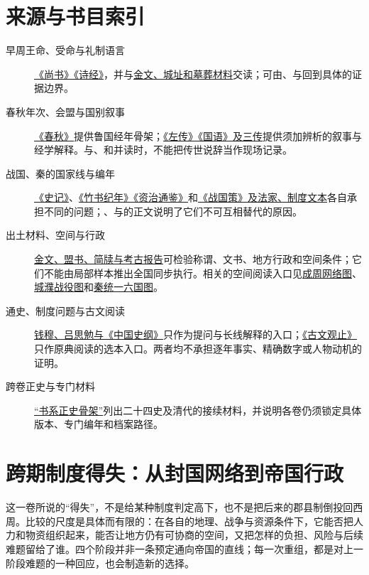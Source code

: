 \section{来源与书目索引}

\begin{description}
  \item[早周王命、受命与礼制语言] \hyperref[src:western-texts]{《尚书》《诗经》}，并与\hyperref[src:excavated]{金文、城址和墓葬材料}交读；可由、与回到具体的证据边界。
  \item[春秋年次、会盟与国别叙事] \hyperref[src:chunqiu]{《春秋》}提供鲁国经年骨架；\hyperref[src:zuozhuan-guoyu]{《左传》《国语》及三传}提供须加辨析的叙事与经学解释。与、和并读时，不能把传世说辞当作现场记录。
  \item[战国、秦的国家线与编年] \hyperref[src:shiji]{《史记》}、\hyperref[src:bamboo-annals-zizhi]{《竹书纪年》《资治通鉴》}和\hyperref[src:warring-texts]{《战国策》及法家、制度文本}各自承担不同的问题；、与的正文说明了它们不可互相替代的原因。
  \item[出土材料、空间与行政] \hyperref[src:excavated]{金文、盟书、简牍与考古报告}可检验称谓、文书、地方行政和空间条件；它们不能由局部样本推出全国同步执行。相关的空间阅读入口见\hyperref[fig:vol01:western-zhou:chengzhou]{成周网络图}、\hyperref[fig:vol01:spring-autumn:chengpu]{城濮战役图}和\hyperref[fig:vol01:warring-qin:qin-unification]{秦统一六国图}。
  \item[通史、制度问题与古文阅读] \hyperref[src:interpretive]{钱穆、吕思勉与《中国史纲》}只作为提问与长线解释的入口；\hyperref[src:guwen-guanzhi]{《古文观止》}只作原典阅读的选本入口。两者均不承担逐年事实、精确数字或人物动机的证明。
  \item[跨卷正史与专门材料] \hyperref[app:bibliography]{“书系正史骨架”}列出二十四史及清代的接续材料，并说明各卷仍须锁定具体版本、专门编年和档案路径。
\end{description}

\section{跨期制度得失：从封国网络到帝国行政}

这一卷所说的“得失”，不是给某种制度判定高下，也不是把后来的郡县制倒投回西周。比较的尺度是具体而有限的：在各自的地理、战争与资源条件下，它能否把人力和物资组织起来，能否让地方仍有可协商的空间，又把怎样的负担、风险与后续难题留给了谁。四个阶段并非一条预定通向帝国的直线；每一次重组，都是对上一阶段难题的一种回应，也会制造新的选择。

